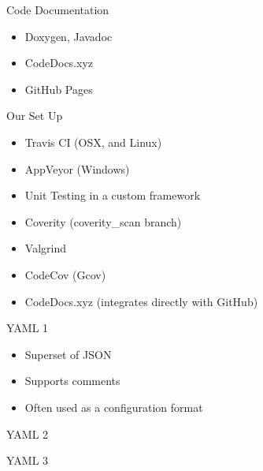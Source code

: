 \documentclass{beamer}
\begin{document}
\begin{frame}{Code Documentation}
	\begin{itemize}
		\item Doxygen, Javadoc
		\item CodeDocs.xyz
		\item GitHub Pages
	\end{itemize}
\end{frame}

\begin{frame}{Our Set Up}
	\begin{itemize}
		\item Travis CI (OSX, and Linux)
		\item AppVeyor (Windows)
		\item Unit Testing in a custom framework
		\item Coverity (coverity\_scan branch)
		\item Valgrind
		\item CodeCov (Gcov)
		\item CodeDocs.xyz (integrates directly with GitHub)
	\end{itemize}
\end{frame}

\begin{frame}{YAML 1}
	\begin{itemize}
		\item Superset of JSON
		\item Supports comments
		\item Often used as a configuration format
	\end{itemize}
\end{frame}


\begin{frame}{YAML 2}
	\lstII
\end{frame}


\begin{frame}{YAML 3}
	\lstIII
\end{frame}
\end{document}
